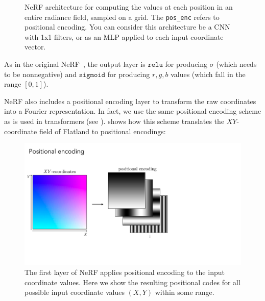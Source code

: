 \begin{figure}
{
    }
    \caption{NeRF architecture for computing the values at each position in an entire radiance field, sampled on a grid. The \texttt{pos\_enc} refers to positional encoding. You can consider this architecture be a CNN with 1x1 filters, or as an MLP applied to each input coordinate vector.}
    \label{fig:nerfs:image_to_image_arch}
\end{figure}



As in the original NeRF~\cite{mildenhall2020nerf}, the output layer is $\texttt{relu}$ for producing $\sigma$ (which needs to be nonnegative) and $\texttt{sigmoid}$ for producing $r,g,b$ values (which fall in the range $[0,1]$).

NeRF also includes a positional encoding layer to transform the raw coordinates into a Fourier representation. In fact, we use the same positional encoding scheme as is used in transformers (see \sect{\ref{sec:transformers:positional_encodings}}). 
\Fig{\ref{fig:nerfs:flatland_positional_encoding}} shows how this scheme translates the $XY$-coordinate field of Flatland to positional encodings:
\begin{figure}[h!]
    \centerline{
    \includegraphics[width=0.7\linewidth]{figures/nerfs/flatland_positional_encoding.pdf}
    }
    \caption{The first layer of NeRF applies positional encoding to the input coordinate values. Here we show the resulting positional codes for all possible input coordinate values $(X,Y)$ within some range.}
    \label{fig:nerfs:flatland_positional_encoding}
\end{figure}

